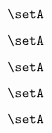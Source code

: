 \begin{forslides}
    \begin{equation}
        \label{eq:slides-processes-165}
        \setA
    \end{equation}

    \begin{equation}
        \label{eq:slides-processes-166}
        \setA
    \end{equation}

    \begin{equation}
        \label{eq:slides-processes-167}
        \setA
    \end{equation}

    \begin{equation}
        \label{eq:slides-processes-168}
        \setA
    \end{equation}

    \begin{equation}
        \label{eq:slides-processes-169}
        \setA
    \end{equation}

\end{forslides}